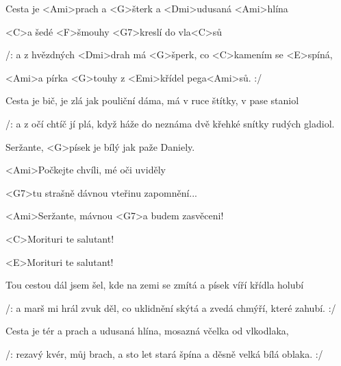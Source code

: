 

\zs
Cesta je <Ami>prach a <G>šterk a <Dmi>udusaná <Ami>hlína

<C>a šedé <F>šmouhy <G7>kreslí do vla<C>sů

/: a z hvězdných <Dmi>drah má <G>šperk, co <C>kamením se <E>spíná,

<Ami>a pírka <G>touhy z <Emi>křídel pega<Ami>sů. :/
\ks

\zs
Cesta je bič, je zlá jak pouliční dáma,
má v ruce štítky, v pase staniol

/: a z očí chtíč jí plá, když háže do neznáma
dvě křehké snítky rudých gladiol.\rlap{ :/}
\ks

\zr
Seržante, <G>písek je bílý jak paže Daniely.

<Ami>Počkejte chvíli, mé oči uviděly

<G7>tu strašně dávnou vteřinu zapomnění...

<Ami>Seržante, mávnou <G7>a budem zasvěceni!

<C>Morituri te salutant!

<E>Morituri te salutant!
\kr

\zs
Tou cestou dál jsem šel, kde na zemi se zmítá
a písek víří křídla holubí

/: a marš mi hrál zvuk děl,
co uklidnění skýtá a zvedá chmýří, které zahubí. :/
\ks

\zs
Cesta je tér a prach a udusaná hlína,
mosazná včelka od vlkodlaka,

/: rezavý kvér, můj brach, a sto let stará špína
a děsně velká bílá oblaka. :/
\ks

\zr \kr

\kp
